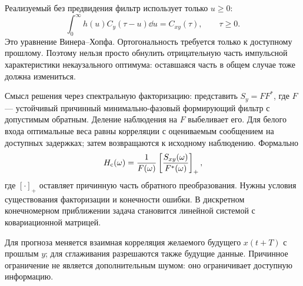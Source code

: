 
Реализуемый без предвидения фильтр использует только $u\geq0$:
\begin{equation}\label{eq:wienerhopf}
 \int_0^\infty h(u)C_y(\tau-u)\dd u=C_{xy}(\tau),\qquad \tau\geq0.
\end{equation}
Это уравнение Винера–Хопфа. Ортогональность требуется только к доступному прошлому. Поэтому нельзя просто обнулить отрицательную часть импульсной характеристики некаузального оптимума: оставшаяся часть в общем случае тоже должна измениться.

Смысл решения через спектральную факторизацию: представить $S_y=F F^*$, где $F$ — устойчивый причинный минимально-фазовый формирующий фильтр с допустимым обратным. Деление наблюдения на $F$ выбеливает его. Для белого входа оптимальные веса равны корреляции с оцениваемым сообщением на доступных задержках; затем возвращаются к исходному наблюдению. Формально
\begin{equation}
 H_{\rm c}(\omega)=\frac1{F(\omega)}
 \left[\frac{S_{xy}(\omega)}{F^*(\omega)}\right]_+,
\end{equation}
где $[\cdot]_+$ оставляет причинную часть обратного преобразования. Нужны условия существования факторизации и конечности ошибки. В дискретном конечномерном приближении задача становится линейной системой с ковариационной матрицей.

Для прогноза меняется взаимная корреляция желаемого будущего $x(t+T)$ с прошлым $y$; для сглаживания разрешаются также будущие данные. Причинное ограничение не является дополнительным шумом: оно ограничивает доступную информацию.
